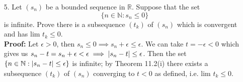 \documentclass{article}
\begin{document}
\newpage
\begin{itemize}
    \item [5.] Let $(s_n)$ be a bounded sequence in $\mathbb{R}$. Suppose that the set \[\{n\in\mathbb{N}:s_n\leq 0\}\] is infinite. Prove there is a subsequence $(t_k)$ of $(s_n)$ which is convergent and has $\text{lim }t_k\leq 0$.\\
          \textbf{Proof: } Let $\epsilon>0$, then $s_n\leq 0\implies s_n+\epsilon\leq\epsilon$. We can take $t=-\epsilon<0$ which gives us $s_n-t=s_n+\epsilon<\epsilon\implies\abs{s_n-t}\leq\epsilon$. Then the set $\{n\in\mathbb{N}:\abs{s_n-t}\leq\epsilon\}$ is infinite; by Theorem 11.2(i) there exists a subsequence $(t_k)$ of $(s_n)$ converging to $t<0$ as defined, i.e. $\text{lim }t_k\leq 0$.
\end{itemize}
\end{document}
